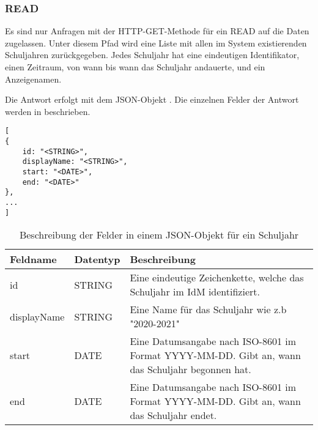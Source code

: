 \subsubsection{READ}
\label{sec:rest:api:school-years:read}
Es sind nur Anfragen mit der HTTP-GET-Methode für ein READ auf die Daten zugelassen.
Unter diesem Pfad wird eine Liste mit allen im System existierenden Schuljahren zurückgegeben.
Jedes Schuljahr hat eine eindeutigen Identifikator, einen Zeitraum, von wann bis wann das Schuljahr andauerte, und ein Anzeigenamen.

Die Antwort erfolgt mit dem JSON-Objekt . 
Die einzelnen Felder der Antwort werden in  beschrieben.

\begin{lstlisting}[caption={JSON-Antwort für einen GET-Aufruf des Pfads /api/school-years},label={lst:code:rest:api:school-years:read:ret},frame=tlrb]
[
{
    id: "<STRING>",
    displayName: "<STRING>",
    start: "<DATE>",
    end: "<DATE>"
},
...
]
\end{lstlisting}

\begin{longtable}{|p{}|p{}|p{}|}
		\caption{Beschreibung der Felder in einem JSON-Objekt für ein Schuljahr}
\endfoot
		\caption{Beschreibung der Felder in einem JSON-Objekt für ein Schuljahr}
		\label{tab:rest:api:school-years:read:ret:json}
\endlastfoot 
\hline
			\textbf{Feldname} & \textbf{Datentyp} & \textbf{Beschreibung} \\ \hline
\endhead
 id & STRING & Eine eindeutige Zeichenkette, welche das Schuljahr im IdM identifiziert. \\ \hline
 displayName & STRING & Eine Name für das Schuljahr wie z.b "2020-2021" \\ \hline
 start & DATE & Eine Datumsangabe nach ISO-8601 im Format YYYY-MM-DD. Gibt an, wann das Schuljahr begonnen hat. \\ \hline
 end & DATE & Eine Datumsangabe nach ISO-8601 im Format YYYY-MM-DD. Gibt an, wann das Schuljahr endet. \\ \hline
\end{longtable}
